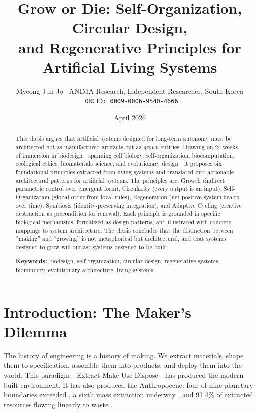 \documentclass[11pt,a4paper]{article}
\title{%
  \textbf{Grow or Die: Self-Organization, Circular Design,\\
  and Regenerative Principles for Artificial Living Systems}
}
\author{%
  Myeong Jun Jo \
  ANIMA Research, Independent Researcher, South Korea \
  \texttt{ORCID: \href{https://orcid.org/0009-0006-9540-4666}{0009-0006-9540-4666}}
}
\date{April 2026}
\begin{document}
\maketitle

\begin{abstract}
This thesis argues that artificial systems designed for long-term autonomy must be architected not as manufactured artifacts but as \emph{grown} entities. Drawing on 24 weeks of immersion in biodesign---spanning cell biology, self-organization, biocomputation, ecological ethics, biomaterials science, and evolutionary design---it proposes six foundational principles extracted from living systems and translated into actionable architectural patterns for artificial systems. The principles are: Growth (indirect parametric control over emergent form), Circularity (every output is an input), Self-Organization (global order from local rules), Regeneration (net-positive system health over time), Symbiosis (identity-preserving integration), and Adaptive Cycling (creative destruction as precondition for renewal). Each principle is grounded in specific biological mechanisms, formalized as design patterns, and illustrated with concrete mappings to system architecture. The thesis concludes that the distinction between ``making'' and ``growing'' is not metaphorical but architectural, and that systems designed to grow will outlast systems designed to be built.

\vspace{6pt}
\noindent\textbf{Keywords:} biodesign, self-organization, circular design, regenerative systems, biomimicry, evolutionary architecture, living systems
\end{abstract}

\section{Introduction: The Maker's Dilemma}

The history of engineering is a history of making. We extract materials, shape them to specification, assemble them into products, and deploy them into the world. This paradigm---Extract-Make-Use-Dispose---has produced the modern built environment. It has also produced the Anthropocene: four of nine planetary boundaries exceeded \citep{rockstrom2009}, a sixth mass extinction underway \citep{ceballos2015}, and 91.4\% of extracted resources flowing linearly to waste \citep{circularitygap2023}.
\end{document}

